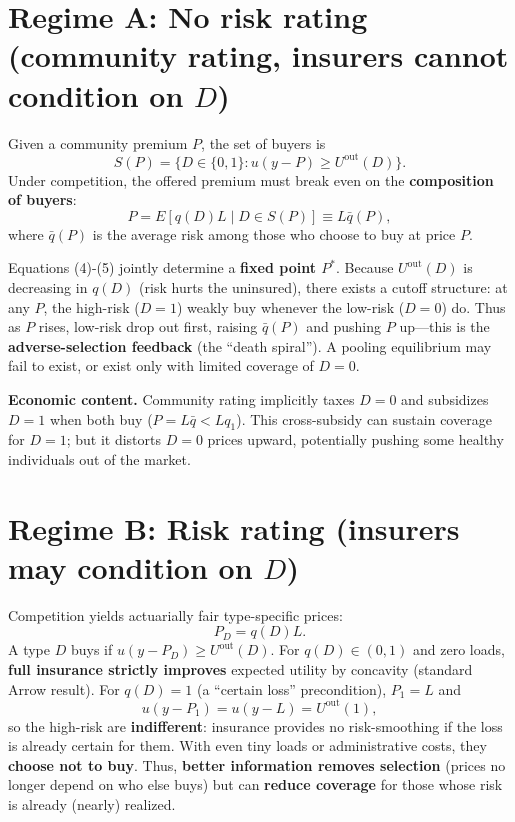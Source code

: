 \documentclass[12pt]{article}
\theoremstyle{plain}
\theoremstyle{plain}
\begin{document}
\section*{Regime A: No risk rating (community rating, insurers cannot condition on $D$)}

Given a community premium $P$, the set of buyers is
\begin{equation}
S(P) = \{D \in \{0,1\} : u(y-P) \ge U^{\text{out}}(D)\}.
\tag{4}
\end{equation}
Under competition, the offered premium must break even on the \textbf{composition of buyers}:
\begin{equation}
P = E[q(D)L \mid D \in S(P)] \equiv L\bar{q}(P),
\tag{5}
\end{equation}
where $\bar{q}(P)$ is the average risk among those who choose to buy at price $P$.

Equations (4)-(5) jointly determine a \textbf{fixed point $P^*$}. Because $U^{\text{out}}(D)$ is decreasing in $q(D)$ (risk hurts the uninsured), there exists a cutoff structure: at any $P$, the high-risk ($D=1$) weakly buy whenever the low-risk ($D=0$) do. Thus as $P$ rises, low-risk drop out first, raising $\bar{q}(P)$ and pushing $P$ up---this is the \textbf{adverse-selection feedback} (the ``death spiral''). A pooling equilibrium may fail to exist, or exist only with limited coverage of $D=0$.

\textbf{Economic content.} Community rating implicitly taxes $D=0$ and subsidizes $D=1$ when both buy ($P=L\bar{q} < Lq_1$). This cross-subsidy can sustain coverage for $D=1$; but it distorts $D=0$ prices upward, potentially pushing some healthy individuals out of the market.

\section*{Regime B: Risk rating (insurers may condition on $D$)}

Competition yields actuarially fair type-specific prices:
\begin{equation}
P_D = q(D)L.
\tag{6}
\end{equation}
A type $D$ buys if $u(y-P_D) \ge U^{\text{out}}(D)$. For $q(D) \in (0,1)$ and zero loads, \textbf{full insurance strictly improves} expected utility by concavity (standard Arrow result). For $q(D) = 1$ (a ``certain loss'' precondition), $P_1 = L$ and
\begin{equation}
u(y-P_1) = u(y-L) = U^{\text{out}}(1),
\tag{7}
\end{equation}
so the high-risk are \textbf{indifferent}: insurance provides no risk-smoothing if the loss is already certain for them. With even tiny loads or administrative costs, they \textbf{choose not to buy}. Thus, \textbf{better information removes selection} (prices no longer depend on who else buys) but can \textbf{reduce coverage} for those whose risk is already (nearly) realized.
\end{document}
